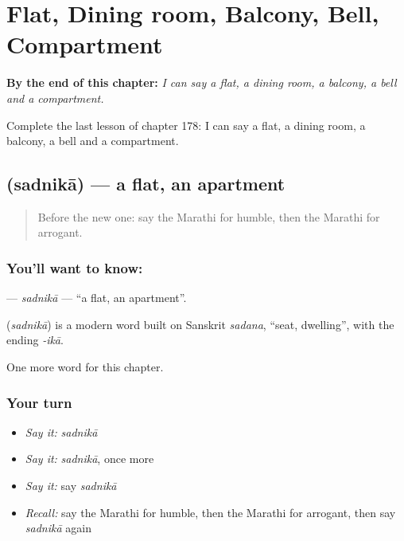 
\chapter{Flat, Dining room, Balcony, Bell, Compartment}
\label{ch:mr-flat-dining-room-balcony-bell-compartment}

\begin{chapteropening}
\textbf{By the end of this chapter:} \emph{I can say a flat, a dining room, a balcony, a bell and a compartment.}

Complete the last lesson of chapter 178: I can say a flat, a dining room, a balcony, a bell and a compartment.
\end{chapteropening}

\section[\texorpdfstring{\mr{सदनिका} (sadnikā)}{सदनिका (sadnikā)}]{ (sadnikā) — a flat, an apartment}

\label{lesson:MR-C178-sadnika}



\begin{quote}
Before the new one: say the Marathi for humble, then the Marathi for arrogant.
\end{quote}

\subsection*{You'll want to know: }
\textbf{} — \emph{sadnikā} — \textquotedblleft{}a flat, an apartment\textquotedblright{}.

\begin{cousinweb}
\textbf{} (\emph{sadnikā}) is a modern word built on Sanskrit \emph{sadana}, \textquotedblleft{}seat, dwelling\textquotedblright{}, with the ending \emph{-ikā}.
\end{cousinweb}

\begin{grammarlens}[title={What you've built}]
One more word for this chapter.
\end{grammarlens}

\subsection*{Your turn}
\begin{itemize}
\raggedright
  \item \emph{Say it:} \emph{sadnikā}
  \item \emph{Say it:} \emph{sadnikā}, once more
  \item \emph{Say it:} say \emph{sadnikā}
  \item \emph{Recall:} say the Marathi for humble, then the Marathi for arrogant, then say \emph{sadnikā} again
\end{itemize}


